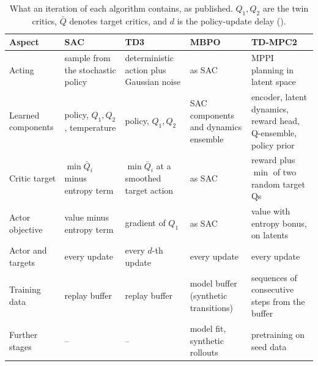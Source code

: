 \begin{table}[tbp]
  \centering
  \footnotesize
  \caption{What an iteration of each algorithm contains, as published.
    $Q_1, Q_2$ are the twin critics, $\bar{Q}$ denotes target critics, and $d$ is the policy-update delay ().}
  \label{tab:alg-iteration}
  \begin{tabular}{@{}p{2.3cm}p{2.5cm}p{2.5cm}p{2.5cm}p{3.0cm}@{}}
    \toprule
    Aspect              & SAC                                    & TD3                                          & MBPO                                  & TD-MPC2                                          \\
    \midrule
    Acting              & sample from the stochastic policy      & deterministic action plus Gaussian noise     & as SAC                                & MPPI planning in latent space                    \\
    Learned components  & policy, $Q_1, Q_2$, temperature        & policy, $Q_1, Q_2$                           & SAC components and dynamics ensemble  & encoder, latent dynamics, reward head, Q-ensemble, policy prior \\
    Critic target       & $\min \bar{Q}_i$ minus entropy term    & $\min \bar{Q}_i$ at a smoothed target action & as SAC                               & reward plus $\min$ of two random target Qs       \\
    Actor objective     & value minus entropy term               & gradient of $Q_1$                            & as SAC                                & value with entropy bonus, on latents             \\
    Actor and targets   & every update                           & every $d$-th update                          & every update                          & every update                                     \\
    Training data       & replay buffer                          & replay buffer                                & model buffer (synthetic transitions)  & sequences of consecutive steps from the buffer   \\
    Further stages      & --                                     & --                                           & model fit, synthetic rollouts         & pretraining on seed data                         \\
    \bottomrule
  \end{tabular}
\end{table}

